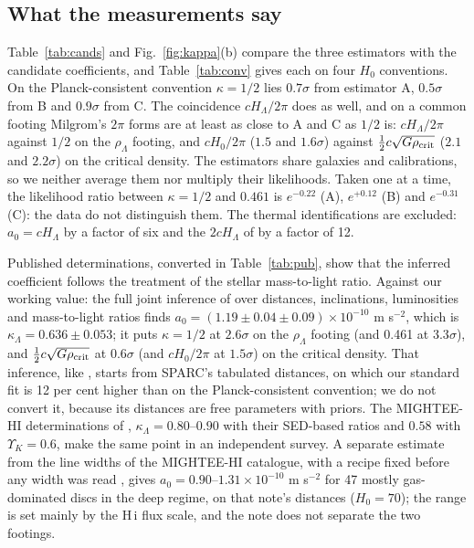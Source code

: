 \documentclass[fleqn,usenatbib]{mnras}
\begin{document}
\subsection{What the measurements say}
\label{sec:measure}
Table~\ref{tab:cands} and Fig.~\ref{fig:kappa}(b) compare the three estimators with the candidate coefficients, and Table~\ref{tab:conv} gives each on four $H_0$ conventions. On the Planck-consistent convention $\kappa=1/2$ lies $0.7\sigma$ from estimator A, $0.5\sigma$ from B and $0.9\sigma$ from C. The coincidence $cH_\Lambda/2\pi$ does as well, and on a common footing Milgrom's $2\pi$ forms are at least as close to A and C as $1/2$ is: $cH_\Lambda/2\pi$ against $1/2$ on the $\rho_\Lambda$ footing, and $cH_0/2\pi$ ($1.5$ and $1.6\sigma$) against $\tfrac12c\sqrt{G\rho_{\rm crit}}$ ($2.1$ and $2.2\sigma$) on the critical density. The estimators share galaxies and calibrations, so we neither average them nor multiply their likelihoods. Taken one at a time, the likelihood ratio between $\kappa=1/2$ and $0.461$ is $e^{-0.22}$ (A), $e^{+0.12}$ (B) and $e^{-0.31}$ (C): the data do not distinguish them. The thermal identifications are excluded: $a_0=cH_\Lambda$ by a factor of six and the $2cH_\Lambda$ of \citet{Milgrom1999} by a factor of 12.

Published determinations, converted in Table~\ref{tab:pub}, show that the inferred coefficient follows the treatment of the stellar mass-to-light ratio. Against our working value: the full joint inference of \citet{Desmond2023} over distances, inclinations, luminosities and mass-to-light ratios finds $a_0=(1.19\pm0.04\pm0.09)\times10^{-10}$ m s$^{-2}$, which is $\kappa_\Lambda=0.636\pm0.053$; it puts $\kappa=1/2$ at $2.6\sigma$ on the $\rho_\Lambda$ footing (and 0.461 at $3.3\sigma$), and $\tfrac12c\sqrt{G\rho_{\rm crit}}$ at $0.6\sigma$ (and $cH_0/2\pi$ at $1.5\sigma$) on the critical density. That inference, like \citet{McGaugh2016}, starts from SPARC's tabulated distances, on which our standard fit is 12 per cent higher than on the Planck-consistent convention; we do not convert it, because its distances are free parameters with priors. The MIGHTEE-HI determinations of \citet{Varasteanu2025,Varasteanu2026}, $\kappa_\Lambda=0.80$--$0.90$ with their SED-based ratios and $0.58$ with $\Upsilon_K=0.6$, make the same point in an independent survey. A separate estimate from the line widths of the MIGHTEE-HI catalogue, with a recipe fixed before any width was read \citep{Zimmerman2026mightee}, gives $a_0=0.90$--$1.31\times10^{-10}$ m s$^{-2}$ for 47 mostly gas-dominated discs in the deep regime, on that note's distances ($H_0=70$); the range is set mainly by the H\,{\sc i} flux scale, and the note does not separate the two footings.
\end{document}
